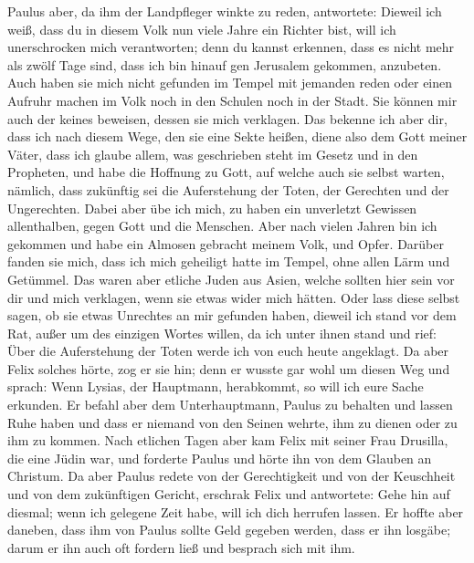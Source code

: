 Paulus aber, da ihm der Landpfleger winkte zu reden,
antwortete: Dieweil ich weiß, dass du in diesem Volk nun viele Jahre ein
Richter bist, will ich unerschrocken mich verantworten; 
denn du kannst erkennen, dass es nicht mehr als zwölf Tage sind, dass
ich bin hinauf gen Jerusalem gekommen, anzubeten.  Auch
haben sie mich nicht gefunden im Tempel mit jemanden reden oder einen
Aufruhr machen im Volk noch in den Schulen noch in der Stadt.
 Sie können mir auch der keines beweisen, dessen sie mich
verklagen.  Das bekenne ich aber dir, dass ich nach
diesem Wege, den sie eine Sekte heißen, diene also dem Gott meiner
Väter, dass ich glaube allem, was geschrieben steht im Gesetz und in den
Propheten,  und habe die Hoffnung zu Gott, auf welche
auch sie selbst warten, nämlich, dass zukünftig sei die Auferstehung der
Toten, der Gerechten und der Ungerechten.  Dabei aber übe
ich mich, zu haben ein unverletzt Gewissen allenthalben, gegen Gott und
die Menschen.  Aber nach vielen Jahren bin ich gekommen
und habe ein Almosen gebracht meinem Volk, und Opfer. 
Darüber fanden sie mich, dass ich mich geheiligt hatte im Tempel, ohne
allen Lärm und Getümmel.  Das waren aber etliche Juden
aus Asien, welche sollten hier sein vor dir und mich verklagen, wenn sie
etwas wider mich hätten.  Oder lass diese selbst sagen,
ob sie etwas Unrechtes an mir gefunden haben, dieweil ich stand vor dem
Rat,  außer um des einzigen Wortes willen, da ich unter
ihnen stand und rief: Über die Auferstehung der Toten werde ich von euch
heute angeklagt.  Da aber Felix solches hörte, zog er sie
hin; denn er wusste gar wohl um diesen Weg und sprach: Wenn Lysias, der
Hauptmann, herabkommt, so will ich eure Sache erkunden. 
Er befahl aber dem Unterhauptmann, Paulus zu behalten und lassen Ruhe
haben und dass er niemand von den Seinen wehrte, ihm zu dienen oder zu
ihm zu kommen.  Nach etlichen Tagen aber kam Felix mit
seiner Frau Drusilla, die eine Jüdin war, und forderte Paulus und hörte
ihn von dem Glauben an Christum.  Da aber Paulus redete
von der Gerechtigkeit und von der Keuschheit und von dem zukünftigen
Gericht, erschrak Felix und antwortete: Gehe hin auf diesmal; wenn ich
gelegene Zeit habe, will ich dich herrufen lassen.  Er
hoffte aber daneben, dass ihm von Paulus sollte Geld gegeben werden,
dass er ihn losgäbe; darum er ihn auch oft fordern ließ und besprach
sich mit ihm.

